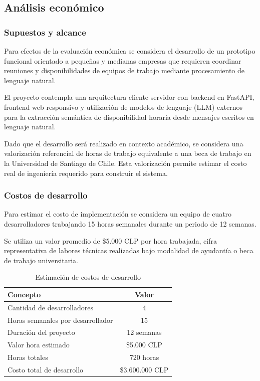 \subsection{Análisis económico}

\subsubsection{Supuestos y alcance}

Para efectos de la evaluación económica se considera el desarrollo de un prototipo funcional orientado a pequeñas y medianas empresas que requieren coordinar reuniones y disponibilidades de equipos de trabajo mediante procesamiento de lenguaje natural.

El proyecto contempla una arquitectura cliente-servidor con backend en FastAPI, frontend web responsivo y utilización de modelos de lenguaje (LLM) externos para la extracción semántica de disponibilidad horaria desde mensajes escritos en lenguaje natural.

Dado que el desarrollo será realizado en contexto académico, se considera una valorización referencial de horas de trabajo equivalente a una beca de trabajo en la Universidad de Santiago de Chile. Esta valorización permite estimar el costo real de ingeniería requerido para construir el sistema.

\subsubsection{Costos de desarrollo}

Para estimar el costo de implementación se considera un equipo de cuatro desarrolladores trabajando 15 horas semanales durante un periodo de 12 semanas.

Se utiliza un valor promedio de \$5.000 CLP por hora trabajada, cifra representativa de labores técnicas realizadas bajo modalidad de ayudantía o beca de trabajo universitaria.

\begin{table}[H]
\centering
\begin{tabular}{|l|c|}
\hline
Concepto & Valor \\ \hline
Cantidad de desarrolladores & 4 \\ \hline
Horas semanales por desarrollador & 15 \\ \hline
Duración del proyecto & 12 semanas \\ \hline
Valor hora estimado & \$5.000 CLP \\ \hline
Horas totales & 720 horas \\ \hline
Costo total de desarrollo & \$3.600.000 CLP \\ \hline
\end{tabular}
\caption{Estimación de costos de desarrollo}
\end{table}

